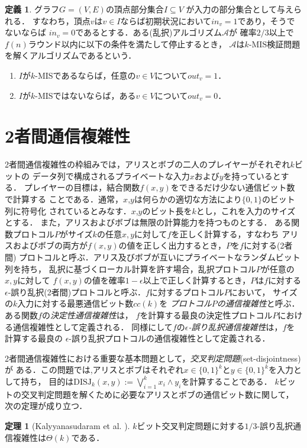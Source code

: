 \documentclass[12pt]{thesis}
\newcommand{\Inp}{\mathit{in}}
\newcommand{\Out}{\mathit{out}}
\theoremstyle{definition}
\newtheorem{theorem}{定理}[chapter]
\newtheorem{definition}{定義}[chapter]
\begin{document}
\begin{definition}
グラフ$G=(V,E)$の頂点部分集合$I \subseteq V$ が入力の部分集合として与えられる．
すなわち，頂点$v$は$v\in I$ならば初期状況において$\Inp_v = 1$であり，そうでないならば
$\Inp_v = 0$であるとする．ある(乱択)アルゴリズム$\mathcal{A}$が
確率$2/3$以上で$f(n)$ラウンド以内に以下の条件を満たして停止するとき，
$\mathcal{A}$は$k$-MIS検証問題を解くアルゴリズムであるという．
\begin{enumerate}
\item $I$が$k$-MISであるならば，任意の$v \in V$について$\Out_v = 1$．
\item $I$が$k$-MISではないならば，ある$v \in V$について$\Out_v = 0$．
\end{enumerate}
\end{definition}

\section{2者間通信複雑性}
2者間通信複雑性の枠組みでは，アリスとボブの二人のプレイヤーがそれぞれ$k$ビットの
データ列で構成されるプライベートな入力$x$および$y$を持っているとする．
プレイヤーの目標は，結合関数$f(x,y)$をできるだけ少ない通信ビット数で計算する
ことである．通常，$x$,$y$は何らかの適切な方法により$\{0,1\}$のビット列に符号化
されているとみなす．$x$,$y$のビット長を$k$とし，これを入力のサイズとする．
また，アリスおよびボブは無限の計算能力を持つものとする．
ある関数プロトコル$P$がサイズ$k$の任意$x, y$に対して$f$を正しく計算する，すなわち
アリスおよびボブの両方が$f(x,y)$の値を正しく出力するとき，$P$を$f$に対する(2者間)
プロトコルと呼ぶ．アリス及びボブが互いにプライベートなランダムビット列を持ち，
乱択に基づくローカル計算を許す場合，乱択プロトコル$P$が任意の$x, y$に対して
$f(x,y)$の値を確率$1-\epsilon$以上で正しく計算するとき，$P$は$f$に対する
$\epsilon$-誤り乱択(2者間)プロトコルと呼ぶ．$f$に対するプロトコル$P$において，
サイズの$k$入力に対する最悪通信ビット数$\mathit{cc}(k)$を
\emph{プロトコル$P$の通信複雑性}と呼ぶ．ある関数$f$の\emph{決定性通信複雑性}は，
$f$を計算する最良の決定性プロトコル$P$における通信複雑性として定義される．
同様にして$f$の\emph{$\epsilon$-誤り乱択通信複雑性}は，$f$を計算する最良の
$\epsilon$-誤り乱択プロトコルの通信複雑性として定義される．

2者間通信複雑性における重要な基本問題として，\emph{交叉判定問題}(set-disjointness)が
ある．この問題では,アリスとボブはそれぞれ$x \in \{0, 1\}^{k}$と$y \in \{0, 1\}^{k}$を入力として持ち，
目的は$\mathrm{DISJ}_{k} (x, y) :=\bigvee_{i = 1}^{k} x_{i} \land y_{i}$を計算することである．
$k$ビットの交叉判定問題を解くために必要なアリスとボブの通信ビット数に関して，
次の定理が成り立つ．
\begin{theorem}[Kalyyanasudaram et al. \cite{kalyanasundaram1992probabilistic}] \label{thm:disjointness}
$k$ビット交叉判定問題に対する$1/3$-誤り乱択通信複雑性は$\Theta(k)$である．
\end{theorem}
\end{document}
